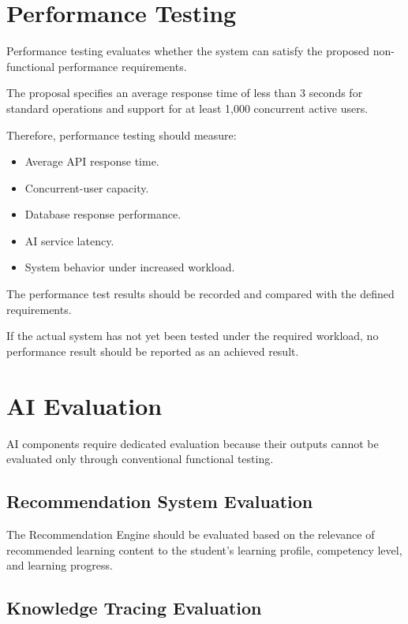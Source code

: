 \section{Performance Testing}

Performance testing evaluates whether the system can satisfy the proposed non-functional performance requirements.

The proposal specifies an average response time of less than 3 seconds for standard operations and support for at least 1,000 concurrent active users.

Therefore, performance testing should measure:

\begin{itemize}
	\item Average API response time.
	\item Concurrent-user capacity.
	\item Database response performance.
	\item AI service latency.
	\item System behavior under increased workload.
\end{itemize}

The performance test results should be recorded and compared with the defined requirements.

If the actual system has not yet been tested under the required workload, no performance result should be reported as an achieved result.

\section{AI Evaluation}

AI components require dedicated evaluation because their outputs cannot be evaluated only through conventional functional testing.

\subsection{Recommendation System Evaluation}

The Recommendation Engine should be evaluated based on the relevance of recommended learning content to the student's learning profile, competency level, and learning progress.

\subsection{Knowledge Tracing Evaluation}

